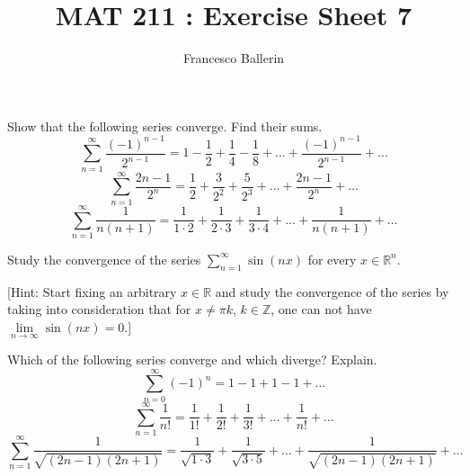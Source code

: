 \documentclass[11pt]{article}%
\title{MAT 211 : Exercise Sheet 7}
\author{Francesco Ballerin}
\date{\color{gray}{\small{francesco.ballerin@uib.no}}}
\begin{document}
\begin{minipage}[t]{\dimexpr \textwidth-6cm-\columnsep}
     \maketitle
\end{minipage}
\hfill\noindent{}

\vspace{50pt}

\begin{Exercise}[title=**] Show that the following series converge. Find their sums. $$\sum_{n=1}^{\infty}\frac{(-1)^{n-1}}{2^{n-1}}=1-\frac{1}{2}+\frac{1}{4}-\frac{1}{8}+\ldots+\frac{(-1)^{n-1}}{2^{n-1}}+\ldots$$ $$\sum_{n=1}^{\infty}\frac{2n-1}{2^n}=\frac{1}{2}+\frac{3}{2^2}+\frac{5}{2^3}+\ldots+\frac{2n-1}{2^n}+\ldots$$ $$\sum_{n=1}^{\infty}\frac{1}{n(n+1)}=\frac{1}{1\cdot 2}+\frac{1}{2\cdot 3}+\frac{1}{3\cdot 4}+\ldots+\frac{1}{n(n+1)}+\ldots$$
\end{Exercise}

\begin{Exercise}[title=*] Study the convergence of the series $\sum_{n=1}^{\infty}\sin (nx)$ for every $x\in\mathbb R^n$. 
\end{Exercise}


[Hint: Start fixing an arbitrary $x\in\mathbb R$ and study the convergence of the series by taking into consideration that for $x\neq \pi k$, $k\in\mathbb Z$, one can not have $\lim\limits_{n\to\infty}\sin(nx)=0$.]
\bigskip

\begin{Exercise}[title=**$\dagger$]
	Which of the following series converge and which diverge? Explain. 
	$$\sum_{n=0}^{\infty}(-1)^n=1-1+1-1+\ldots$$ $$\sum_{n=1}^{\infty}\frac{1}{n!}=\frac{1}{1!}+\frac{1}{2!}+\frac{1}{3!}+\ldots+\frac{1}{n!}+\ldots$$ $$\sum_{n=1}^{\infty}\frac{1}{\sqrt{(2n-1)(2n+1)}}=\frac{1}{\sqrt {1\cdot 3}}+\frac{1}{\sqrt {3\cdot 5}}+\ldots+\frac{1}{\sqrt{(2n-1)(2n+1)}}+\ldots$$
\end{Exercise}
\end{document}

